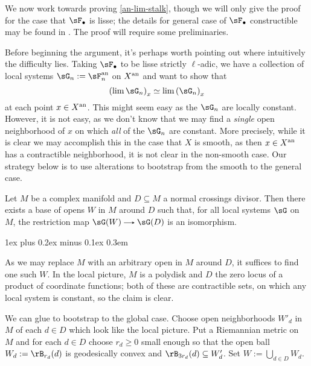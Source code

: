 \documentclass[11pt,leqno]{article}
\makeatletter
\newcommand{\thmheadfont}{\scshape}
\newcommand{\thmhorizspace}{0.3em}
\newcommand{\thmsep}{\hspace{\thmhorizspace}---}
\renewenvironment{proof}[1][Proof]{\par
  \pushQED{\qed}%
  \normalfont%
  \topsep1ex plus 0.2ex minus 0.1ex\relax%
  \labelsep \thmhorizspace\relax%
  \trivlist
  \item[\hskip\labelsep\thmheadfont#1\@addpunct{\thmsep}]\ignorespaces
}{%
  \popQED\endtrivlist\@endpefalse%
}
\theoremstyle{block}
\numberwithin{subblock}{block}
\numberwithin{equation}{subblock}
\newcommand{\arrlen}{1.25em}
\renewcommand{\to}{\mathrel{\tikz[baseline]%
    \draw[>=stealth,->](0,0.5ex)--(\arrlen,0.5ex);}}
\renewcommand{\l}{\left}
\renewcommand{\r}{\right}
\newcommand{\ce}{\mathrel{:=}}%
\newcommand{\iso}{\simeq}
\numberwithin{block}{section}
\makeatother
\begin{document}
\begin{nothing}
  \label{an-proof}
  We now work towards proving \cref{an-lim-stalk}, though we will only give the proof for the case that $\sF_\bullet$ is lisse; the details for general case of $\sF_\bullet$ constructible may be found in \cite[\S 1.4.7]{conrad-etale}. The proof will require some preliminaries.

  \begin{subremark}
    \label{an-proof-issue}
    Before beginning the argument, it's perhaps worth pointing out where intuitively the difficulty lies. Taking $\sF_\bullet$ to be lisse strictly $\ell$-adic, we have a collection of local systems $\sG_n \ce \sF_n^\an$ on $X^{\mathrm{an}}$ and want to show that
    \[
      \l(\lim \sG_n\r)_x \iso \lim {\l(\sG_n\r)_x}
    \]
    at each point $x \in X^{\mathrm{an}}$. This might seem easy as the $\sG_n$ are locally constant. However, it is not easy, as we don't know that we may find a \emph{single} open neighborhood of $x$ on which \emph{all} of the $\sG_n$ are constant. More precisely, while it is clear we may accomplish this in the case that $X$ is smooth, as then $x \in X^{\mathrm{an}}$ has a contractible neighborhood, it is not clear in the non-smooth case. Our strategy below is to use alterations to bootstrap from the smooth to the general case.
  \end{subremark}
  
  \begin{sublemma}
    \label{an-proof-smooth}
    Let $M$ be a complex manifold and $D \subseteq M$ a normal crossings divisor. Then there exists a base of opens $W$ in $M$ around $D$ such that, for all local systems $\sG$ on $M$, the restriction map $\sG(W) \to \sG(D)$ is an isomorphism.

    \begin{proof}
      As we may replace $M$ with an arbitrary open in $M$ around $D$, it suffices to find one such $W$. In the local picture, $M$ is a polydisk and $D$ the zero locus of a product of coordinate functions; both of these are contractible sets, on which any local system is constant, so the claim is clear.

      We can glue to bootstrap to the global case. Choose open neighborhoods $W'_d$ in $M$ of each $d \in D$ which look like the local picture. Put a Riemannian metric on $M$ and for each $d \in D$ choose $r_d \ge 0$ small enough so that the open ball $W_d \ce \rB_{r_d}(d)$ is geodesically convex and $\rB_{3r_d}(d) \subseteq W'_d$. Set $W \ce \bigcup_{d \in D} W_d$.


\end{proof}
\end{sublemma}
\end{nothing}
\end{document}

